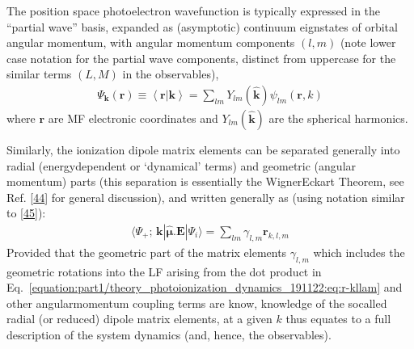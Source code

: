 \documentclass[letterpaper,table,10pt,english]{jupyterBook}
\begin{document}
\sphinxAtStartPar
The position space photoelectron wavefunction is typically expressed in
the “partial wave” basis, expanded as (asymptotic) continuum
eignstates of orbital angular momentum, with angular momentum components
\((l,m)\) (note lower case notation for the partial wave components, distinct from upper\sphinxhyphen{}case for the similar terms \((L,M)\) in the observables),
\begin{equation}\label{equation:part1/theory_photoionization_dynamics_191122:eq:elwf}
\begin{split}\Psi_\mathbf{k}(\boldsymbol{r})\equiv\left<\boldsymbol{r}|\mathbf{k}\right> = \sum_{lm}Y_{lm}(\mathbf{\hat{k}})\psi_{lm}(\boldsymbol{r},k)
\end{split}
\end{equation}
\sphinxAtStartPar
where \(\boldsymbol{r}\) are MF electronic coordinates and
\(Y_{lm}(\mathbf{\hat{k}})\) are the spherical harmonics.

\sphinxAtStartPar
Similarly, the ionization dipole matrix elements can be separated
generally into radial (energy\sphinxhyphen{}dependent or ‘dynamical’ terms) and
geometric (angular momentum) parts (this separation is essentially the
Wigner\sphinxhyphen{}Eckart Theorem, see Ref. {[}\hyperlink{cite.backmatter/bibliography:id824}{44}{]} for general discussion),
and written generally as (using notation similar to {[}\hyperlink{cite.backmatter/bibliography:id694}{45}{]}):
\begin{equation}\label{equation:part1/theory_photoionization_dynamics_191122:eq:r-kllam}
\begin{split}\langle\Psi_{+};\,\mathbf{k}|\hat{\boldsymbol{\mu}}.\boldsymbol{\mathbf{E}}|\Psi_{i}\rangle = \sum_{lm}\gamma_{l,m}\mathbf{r}_{k,l,m}
\end{split}
\end{equation}
\sphinxAtStartPar
Provided that the geometric part of the matrix elements \(\gamma_{l,m}\) \sphinxhyphen{}
which includes the geometric rotations into the LF arising from the dot
product in Eq. \eqref{equation:part1/theory_photoionization_dynamics_191122:eq:r-kllam} and other angular\sphinxhyphen{}momentum coupling terms \sphinxhyphen{} are
know, knowledge of the so\sphinxhyphen{}called radial (or reduced) dipole matrix
elements, at a given \(k\) thus equates to a full description of the
system dynamics (and, hence, the observables).
\end{document}
